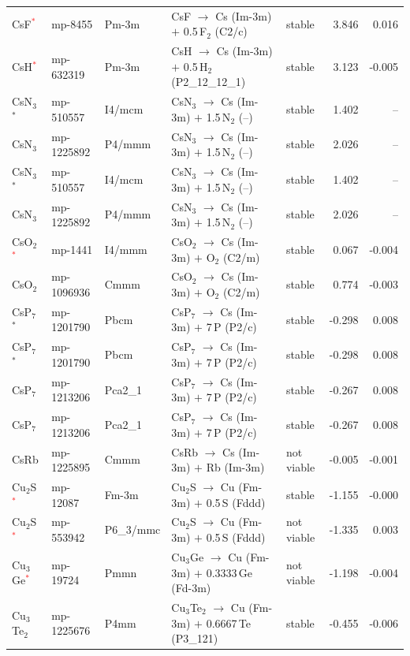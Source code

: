 \begin{longtable}{@{}ll l@{\hspace{4pt}} p{4.6cm} l@{\hspace{4pt}} rr@{}}
CsF\textcolor{red}{$^*$} & mp-8455 & Pm-3m & CsF $\to$ Cs (Im-3m) $+$ 0.5\,F$_{2}$ (C2/c) & stable & 3.846 & 0.016 \\
CsH\textcolor{red}{$^*$} & mp-632319 & Pm-3m & CsH $\to$ Cs (Im-3m) $+$ 0.5\,H$_{2}$ (P2\_12\_12\_1) & stable & 3.123 & -0.005 \\
CsN$_{3}$$^*$ & mp-510557 & I4/mcm & CsN$_{3}$ $\to$ Cs (Im-3m) $+$ 1.5\,N$_{2}$ (--) & stable & 1.402 & -- \\
CsN$_{3}$ & mp-1225892 & P4/mmm & CsN$_{3}$ $\to$ Cs (Im-3m) $+$ 1.5\,N$_{2}$ (--) & stable & 2.026 & -- \\
CsN$_{3}$$^*$ & mp-510557 & I4/mcm & CsN$_{3}$ $\to$ Cs (Im-3m) $+$ 1.5\,N$_{2}$ (--) & stable & 1.402 & -- \\
CsN$_{3}$ & mp-1225892 & P4/mmm & CsN$_{3}$ $\to$ Cs (Im-3m) $+$ 1.5\,N$_{2}$ (--) & stable & 2.026 & -- \\
CsO$_{2}$\textcolor{red}{$^*$} & mp-1441 & I4/mmm & CsO$_{2}$ $\to$ Cs (Im-3m) $+$ O$_{2}$ (C2/m) & stable & 0.067 & -0.004 \\
CsO$_{2}$ & mp-1096936 & Cmmm & CsO$_{2}$ $\to$ Cs (Im-3m) $+$ O$_{2}$ (C2/m) & stable & 0.774 & -0.003 \\
CsP$_{7}$$^*$ & mp-1201790 & Pbcm & CsP$_{7}$ $\to$ Cs (Im-3m) $+$ 7\,P (P2/c) & stable & -0.298 & 0.008 \\
CsP$_{7}$$^*$ & mp-1201790 & Pbcm & CsP$_{7}$ $\to$ Cs (Im-3m) $+$ 7\,P (P2/c) & stable & -0.298 & 0.008 \\
CsP$_{7}$ & mp-1213206 & Pca2\_1 & CsP$_{7}$ $\to$ Cs (Im-3m) $+$ 7\,P (P2/c) & stable & -0.267 & 0.008 \\
CsP$_{7}$ & mp-1213206 & Pca2\_1 & CsP$_{7}$ $\to$ Cs (Im-3m) $+$ 7\,P (P2/c) & stable & -0.267 & 0.008 \\
CsRb & mp-1225895 & Cmmm & CsRb $\to$ Cs (Im-3m) $+$ Rb (Im-3m) & not viable & -0.005 & -0.001 \\
Cu$_{2}$S\textcolor{red}{$^*$} & mp-12087 & Fm-3m & Cu$_{2}$S $\to$ Cu (Fm-3m) $+$ 0.5\,S (Fddd) & stable & -1.155 & -0.000 \\
Cu$_{2}$S\textcolor{red}{$^*$} & mp-553942 & P6\_3/mmc & Cu$_{2}$S $\to$ Cu (Fm-3m) $+$ 0.5\,S (Fddd) & not viable & -1.335 & 0.003 \\
Cu$_{3}$Ge\textcolor{red}{$^*$} & mp-19724 & Pmmn & Cu$_{3}$Ge $\to$ Cu (Fm-3m) $+$ 0.3333\,Ge (Fd-3m) & not viable & -1.198 & -0.004 \\
Cu$_{3}$Te$_{2}$ & mp-1225676 & P4mm & Cu$_{3}$Te$_{2}$ $\to$ Cu (Fm-3m) $+$ 0.6667\,Te (P3\_121) & stable & -0.455 & -0.006 \\

\end{longtable}
